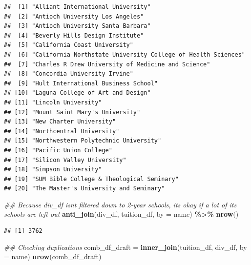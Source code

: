 \documentclass[
]{article}
\newenvironment{Shaded}{\begin{snugshade}}{\end{snugshade}}
\newcommand{\CommentTok}[1]{\textcolor[rgb]{0.56,0.35,0.01}{\textit{#1}}}
\newcommand{\DataTypeTok}[1]{\textcolor[rgb]{0.13,0.29,0.53}{#1}}
\newcommand{\KeywordTok}[1]{\textcolor[rgb]{0.13,0.29,0.53}{\textbf{#1}}}
\newcommand{\NormalTok}[1]{#1}
\newcommand{\OperatorTok}[1]{\textcolor[rgb]{0.81,0.36,0.00}{\textbf{#1}}}
\newcommand{\StringTok}[1]{\textcolor[rgb]{0.31,0.60,0.02}{#1}}
\begin{document}
\begin{verbatim}
##  [1] "Alliant International University"                           
##  [2] "Antioch University Los Angeles"                             
##  [3] "Antioch University Santa Barbara"                           
##  [4] "Beverly Hills Design Institute"                             
##  [5] "California Coast University"                                
##  [6] "California Northstate University College of Health Sciences"
##  [7] "Charles R Drew University of Medicine and Science"          
##  [8] "Concordia University Irvine"                                
##  [9] "Hult International Business School"                         
## [10] "Laguna College of Art and Design"                           
## [11] "Lincoln University"                                         
## [12] "Mount Saint Mary's University"                              
## [13] "New Charter University"                                     
## [14] "Northcentral University"                                    
## [15] "Northwestern Polytechnic University"                        
## [16] "Pacific Union College"                                      
## [17] "Silicon Valley University"                                  
## [18] "Simpson University"                                         
## [19] "SUM Bible College & Theological Seminary"                   
## [20] "The Master's University and Seminary"
\end{verbatim}

\begin{Shaded}
\begin{Highlighting}[]
\CommentTok{\#\# Because div\_df isn\textquotesingle{}t filtered down to 2{-}year schools, it\textquotesingle{}s okay if a lot of its schools are left out}
\KeywordTok{anti\_join}\NormalTok{(div\_df, tuition\_df, }\DataTypeTok{by =} \StringTok{\textquotesingle{}name\textquotesingle{}}\NormalTok{) }\OperatorTok{\%\textgreater{}\%}\StringTok{ }
\StringTok{    }\KeywordTok{nrow}\NormalTok{()}
\end{Highlighting}
\end{Shaded}

\begin{verbatim}
## [1] 3762
\end{verbatim}

\begin{Shaded}
\begin{Highlighting}[]
\CommentTok{\#\# Checking duplications}
\NormalTok{comb\_df\_draft =}\StringTok{ }\KeywordTok{inner\_join}\NormalTok{(tuition\_df, div\_df, }\DataTypeTok{by =} \StringTok{\textquotesingle{}name\textquotesingle{}}\NormalTok{)}
\KeywordTok{nrow}\NormalTok{(comb\_df\_draft)}
\end{Highlighting}
\end{Shaded}
\end{document}
